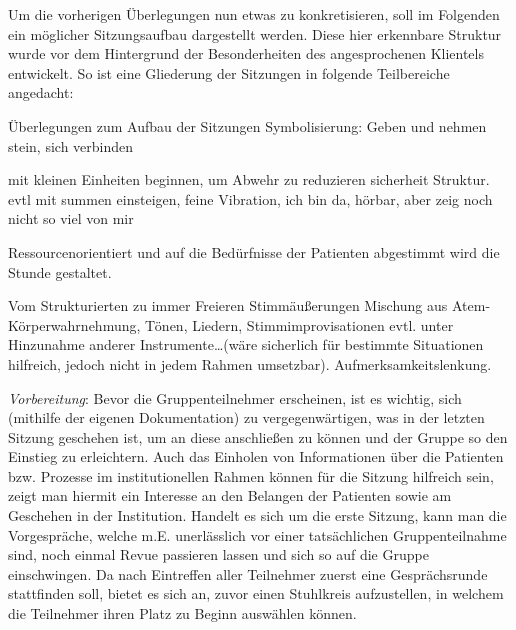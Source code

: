 Um die vorherigen Überlegungen nun etwas zu konkretisieren, soll im Folgenden ein möglicher Sitzungsaufbau dargestellt werden. Diese hier erkennbare Struktur wurde vor dem Hintergrund der Besonderheiten des angesprochenen Klientels entwickelt. So ist eine Gliederung der Sitzungen in folgende Teilbereiche angedacht:



Überlegungen zum Aufbau der Sitzungen
Symbolisierung: Geben und nehmen stein, sich verbinden

mit kleinen Einheiten beginnen, um Abwehr zu reduzieren sicherheit Struktur. evtl mit summen einsteigen, feine Vibration, ich bin da, hörbar, aber zeig noch nicht so viel von mir

Ressourcenorientiert und auf die Bedürfnisse der Patienten abgestimmt wird die Stunde gestaltet.

Vom Strukturierten zu immer Freieren Stimmäußerungen
Mischung aus Atem- Körperwahrnehmung, Tönen, Liedern, Stimmimprovisationen evtl. unter Hinzunahme anderer Instrumente…(wäre sicherlich für bestimmte Situationen hilfreich, jedoch nicht in jedem Rahmen umsetzbar). 
Aufmerksamkeitslenkung. 

\emph{Vorbereitung}:
Bevor die Gruppenteilnehmer erscheinen, ist es wichtig, sich (mithilfe der eigenen Dokumentation) zu vergegenwärtigen, was in der letzten Sitzung geschehen ist, um an diese anschließen zu können und der Gruppe so den Einstieg zu erleichtern. Auch das Einholen von Informationen über die Patienten bzw. Prozesse im institutionellen Rahmen können für die Sitzung hilfreich sein, zeigt man hiermit ein Interesse an den Belangen der Patienten sowie am Geschehen in der Institution. Handelt es sich um die erste Sitzung, kann man die Vorgespräche, welche m.E. unerlässlich vor einer tatsächlichen Gruppenteilnahme sind, noch einmal Revue passieren lassen und sich so auf die Gruppe einschwingen.
Da nach Eintreffen aller Teilnehmer zuerst eine Gesprächsrunde stattfinden soll, bietet es sich an, zuvor einen Stuhlkreis aufzustellen, in welchem die Teilnehmer ihren Platz zu Beginn auswählen können. 

